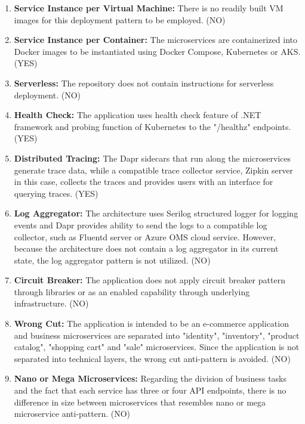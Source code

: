\documentclass{Configuration_Files/PoliMi3i_thesis}
\begin{document}
\begin{enumerate}
    \item \textbf{Service Instance per Virtual Machine:} There is no readily built VM images for this deployment pattern to be employed. (NO)
    
    \item \textbf{Service Instance per Container:} The microservices are containerized into Docker images to be instantiated using Docker Compose, Kubernetes or AKS. (YES)
    
    \item \textbf{Serverless:} The repository does not contain instructions for serverless deployment. (NO)
    
    \item \textbf{Health Check:} The application uses health check feature of .NET framework and probing function of Kubernetes to the "/healthz" endpoints. (YES)
    
    \item \textbf{Distributed Tracing:} The Dapr sidecars that run along the microservices generate trace data, while a compatible trace collector service, Zipkin server in this case, collects the traces and provides users with an interface for querying traces. (YES)
    
    \item \textbf{Log Aggregator:} The architecture uses Serilog structured logger for logging events and Dapr provides ability to send the logs to a compatible log collector, such as Fluentd server or Azure OMS cloud service.
    However, because the architecture does not contain a log aggregator in its current state, the log aggregator pattern is not utilized. (NO)
    
    \item \textbf{Circuit Breaker:} The application does not apply circuit breaker pattern through libraries or as an enabled capability through underlying infrastructure. (NO)
    
    \item \textbf{Wrong Cut:} The application is intended to be an e-commerce application and business microservices are separated into "identity", "inventory", "product catalog", "shopping cart" and "sale" microservices.
    Since the application is not separated into technical layers, the wrong cut anti-pattern is avoided. (NO)
    
    \item \textbf{Nano or Mega Microservices:} Regarding the division of business tasks and the fact that each service has three or four API endpoints, there is no difference in size between microservices that resembles nano or mega microservice anti-pattern. (NO)
    

\end{enumerate}
\end{document}

